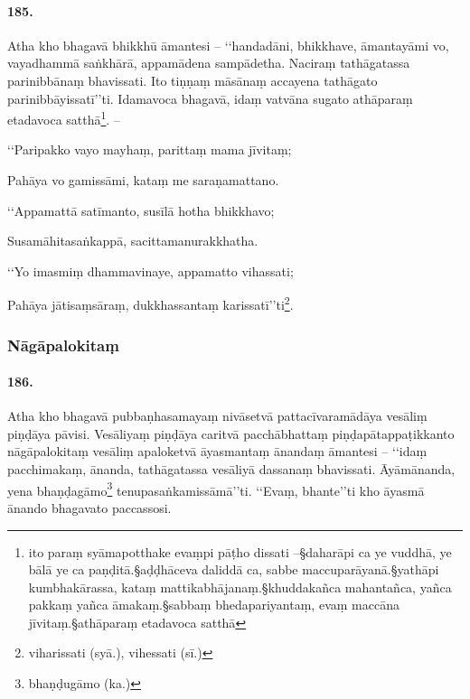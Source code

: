 \paragraph{185.} Atha kho bhagavā bhikkhū āmantesi – ‘‘handadāni, bhikkhave, āmantayāmi vo, vayadhammā saṅkhārā, appamādena sampādetha. Naciraṃ tathāgatassa parinibbānaṃ bhavissati. Ito tiṇṇaṃ māsānaṃ accayena tathāgato parinibbāyissatī’’ti. Idamavoca bhagavā, idaṃ vatvāna sugato athāparaṃ etadavoca satthā\footnote{ito paraṃ syāmapotthake evaṃpi pāṭho dissati –§daharāpi ca ye vuddhā, ye bālā ye ca paṇḍitā.§aḍḍhāceva daliddā ca, sabbe maccuparāyanā.§yathāpi kumbhakārassa, kataṃ mattikabhājanaṃ.§khuddakañca mahantañca, yañca pakkaṃ yañca āmakaṃ.§sabbaṃ bhedapariyantaṃ, evaṃ maccāna jīvitaṃ.§athāparaṃ etadavoca satthā}. –

‘‘Paripakko vayo mayhaṃ, parittaṃ mama jīvitaṃ;

Pahāya vo gamissāmi, kataṃ me saraṇamattano.

‘‘Appamattā satīmanto, susīlā hotha bhikkhavo;

Susamāhitasaṅkappā, sacittamanurakkhatha.

‘‘Yo imasmiṃ dhammavinaye, appamatto vihassati;

Pahāya jātisaṃsāraṃ, dukkhassantaṃ karissatī’’ti\footnote{viharissati (syā.), vihessati (sī.)}.


\subsubsection{Nāgāpalokitaṃ}

\paragraph{186.} Atha kho bhagavā pubbaṇhasamayaṃ nivāsetvā pattacīvaramādāya vesāliṃ piṇḍāya pāvisi. Vesāliyaṃ piṇḍāya caritvā pacchābhattaṃ piṇḍapātappaṭikkanto nāgāpalokitaṃ vesāliṃ apaloketvā āyasmantaṃ ānandaṃ āmantesi – ‘‘idaṃ pacchimakaṃ, ānanda, tathāgatassa vesāliyā dassanaṃ bhavissati. Āyāmānanda, yena bhaṇḍagāmo\footnote{bhaṇḍugāmo (ka.)} tenupasaṅkamissāmā’’ti. ‘‘Evaṃ, bhante’’ti kho āyasmā ānando bhagavato paccassosi.

